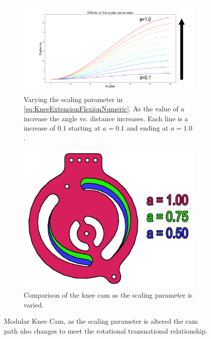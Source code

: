 \begin{figure}
    \centering
    \begin{subfigure}{\columnwidth}
        \centering
        \includegraphics[width=\columnwidth]{images/mech_design/scalar_varying_a_Annotated.png}
        \caption[Scaling Parameter]{Varying the scaling parameter in \autoref{eq:KneeExtensionFlexionNumeric}. As the value of $a$ increase the angle vs. distance increases. Each line is a increase of $0.1$ starting at $a=0.1$ and ending at $a=1.0$.}
        \label{fig:a_varying}
    \end{subfigure}
    \begin{subfigure}{\columnwidth}
        \centering
        \includegraphics[scale=0.35]{images/mech_design/knee_model.png}
        \caption[Comparison of the Knee Cam]{Comparison of the knee cam as the scaling parameter is varied.}
        \label{fig:KneePlateDesign}
    \end{subfigure}
    \caption[Modular Knee Cam]{Modular Knee Cam, as the scaling parameter is altered the cam path also changes to meet the rotational \rightarrow transnational relationship.}
    \label{fig:kneecam}
\end{figure}








